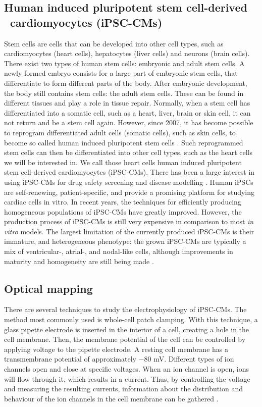 \documentclass{article}
\begin{document}
\subsection{Human induced pluripotent stem cell-derived \ cardiomyocytes (iPSC-CMs)}
Stem cells are cells that can be developed into other cell types, such as cardiomyocytes (heart cells), hepatocytes (liver cells) and neurons (brain cells). There exist two types of human stem cells: embryonic and adult stem cells. A newly formed embryo consists for a large part of embryonic stem cells, that differentiate to form different parts of the body. After embryonic development, the body still contains stem cells: the adult stem cells. These can be found in different tissues and play a role in tissue repair. Normally, when a stem cell has differentiated into a somatic cell, such as a heart, liver, brain or skin cell, it can not return and be a stem cell again. However, since 2007, it has become possible to reprogram differentiated adult cells (somatic cells), such as skin cells, to become so called human induced pluripotent stem cells \cite{Takahashi2007}. Such reprogrammed stem cells can then be differentiated into other cell types, such as the heart cells we will be interested in. We call those heart cells human induced pluripotent stem cell-derived cardiomyocytes (iPSC-CMs). There has been a large interest in using iPSC-CMs for drug safety screening and disease modelling \cite{Sallam2016}. Human iPSCs are self-renewing, patient-specific, and provide a promising platform for studying cardiac cells in vitro\cite{Rajamohan2013}. In recent years, the techniques for efficiently producing homogeneous populations of iPSC-CMs  have greatly improved. However, the production process of iPSC-CMs is still very expensive in comparison to most \textit{in vitro} models. The largest limitation of the currently produced iPSC-CMs is their immature, and heterogeneous phenotype: the grown iPSC-CMs are typically a mix of ventricular-, atrial-, and nodal-like cells, although improvements in maturity and homogeneity are still being made \cite{Denning2016}. 
%
\subsection{Optical mapping}
There are several techniques to study the electrophysiology of iPSC-CMs. The method most commonly used is whole-cell patch clamping. With this technique, a glass pipette electrode is inserted in the interior of a cell, creating a hole in the cell membrane. Then, the membrane potential of the cell can be controlled by applying voltage to the pipette electrode. A resting cell membrane has a transmembrane potential of approximately $-80$ mV. Different types of ion channels open and close at specific voltages. When an ion channel is open, ions will flow through it, which results in a current. Thus, by controlling the voltage and measuring the resulting currents, information about the distribution and behaviour of the ion channels in the cell membrane can be gathered \cite{sakmann2013}. 
\end{document}

